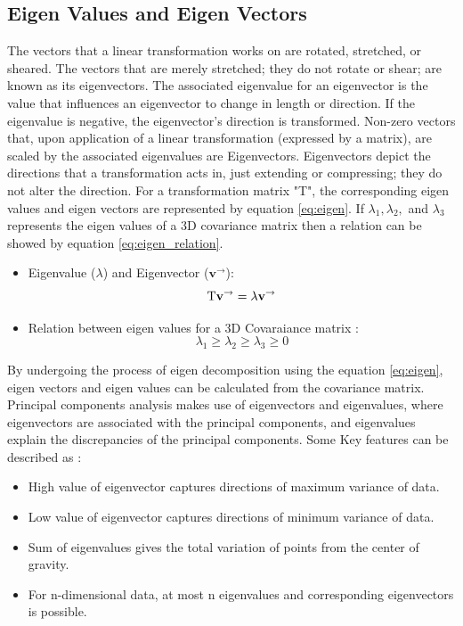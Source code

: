 \subsection{Eigen Values and Eigen Vectors}
 The vectors that a linear transformation works on are rotated, stretched, or sheared. The vectors that are merely stretched; they do not rotate or shear; are known as its eigenvectors. The associated eigenvalue for an eigenvector is the value that influences an eigenvector to change in length or direction. If the eigenvalue is negative, the eigenvector's direction is transformed. Non-zero vectors that, upon application of a linear transformation (expressed by a matrix), are scaled by the associated eigenvalues are Eigenvectors. Eigenvectors depict the directions that a transformation acts in, just extending or compressing; they do not alter the direction. For a transformation matrix "T", the corresponding eigen values and eigen vectors are represented by equation \ref{eq:eigen}. If \( \lambda_1, \lambda_2, \) and \( \lambda_3 \) represents the eigen values of a 3D covariance matrix then a relation can be showed by equation \ref{eq:eigen_relation}.

\begin{itemize}
    \item Eigenvalue (\( \lambda \)) and Eigenvector (\( \mathbf{v}^{\rightarrow} \)):
    \begin{equation}\label{eq:eigen}
    \text T \mathbf{v}^{\rightarrow} = \lambda \mathbf{v}^{\rightarrow}
    \end{equation}
    \item Relation between eigen values for a 3D Covaraiance matrix :
    \begin{equation}\label{eq:eigen_relation}
    \lambda_1 \geq \lambda_2 \geq \lambda_3 \geq 0
    \end{equation}
    
\end{itemize}

By undergoing the process of eigen decomposition using the equation \ref{eq:eigen}, eigen vectors and eigen values can be calculated from the covariance matrix. Principal components analysis makes use of eigenvectors and eigenvalues, where eigenvectors are associated with the principal components, and eigenvalues explain the discrepancies of the principal components. Some Key features can be described as :
\begin{itemize}
    \item High value of eigenvector captures directions of maximum variance of data.
    \item Low value of eigenvector captures directions of minimum variance of data.
    \item Sum of eigenvalues gives the total variation of points from the center of gravity.
    \item For n-dimensional data, at most n eigenvalues and corresponding eigenvectors is possible.
\end{itemize}


